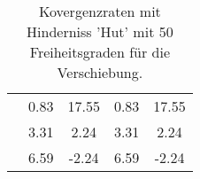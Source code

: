\begin{table}
\begin{tabular}{c|cc|cc|}
\multicolumn{1}{|c|}{} & \multicolumn{1}{|c|}{      0.83} & \multicolumn{1}{|c|}{     17.55} & \multicolumn{1}{|c|}{      0.83} & \multicolumn{1}{|c|}{     17.55} \\ 
\multicolumn{1}{|c|}{} & \multicolumn{1}{|c|}{      3.31} & \multicolumn{1}{|c|}{      2.24} & \multicolumn{1}{|c|}{      3.31} & \multicolumn{1}{|c|}{      2.24} \\ 
\multicolumn{1}{|c|}{} & \multicolumn{1}{|c|}{      6.59} & \multicolumn{1}{|c|}{     -2.24} & \multicolumn{1}{|c|}{      6.59} & \multicolumn{1}{|c|}{     -2.24} \\ 
\hline 
\end{tabular}\caption{Kovergenzraten mit Hinderniss 'Hut' mit 50 Freiheitsgraden für die Verschiebung.}\label{tab:Rate_Hut_level1}
\end{table} 
